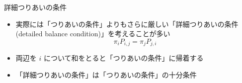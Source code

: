 
\begin{frame}[t,fragile]{詳細つりあいの条件}
  \begin{itemize}
  \item 実際には「つりあいの条件」よりもさらに厳しい「詳細つりあいの条件 (detailed balance condition)」を考えることが多い
    \[ \pi_i P_{i,j} = \pi_j P_{j,i} \]
  \item 両辺を $i$ について和をとると「つりあいの条件」に帰着する
  \item 「詳細つりあいの条件」は「つりあいの条件」の十分条件
  \end{itemize}
\end{frame}
